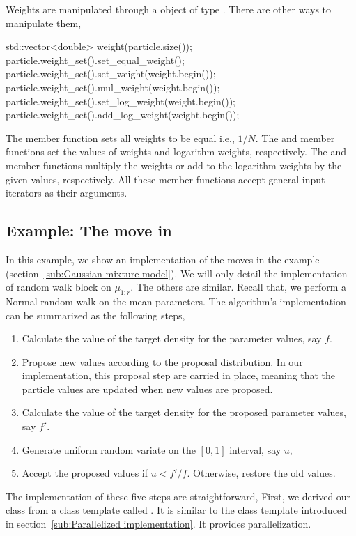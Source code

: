 Weights are manipulated through a object of type . There
are other ways to manipulate them,
\begin{cppcode}
std::vector<double> weight(particle.size());
particle.weight_set().set_equal_weight();
particle.weight_set().set_weight(weight.begin());
particle.weight_set().mul_weight(weight.begin());
particle.weight_set().set_log_weight(weight.begin());
particle.weight_set().add_log_weight(weight.begin());
\end{cppcode}
The  member function sets all weights to be equal
i.e., $1/N$. The  and  member
functions set the values of weights and logarithm weights, respectively. The
 and  member functions
multiply the weights or add to the logarithm weights by the given values,
respectively. All these member functions accept general input iterators as
their arguments.

\subsection{Example: The \protect\mcmc move in \protect\gmm}
\label{sub:Example: The mcmc move in gmm}

In this example, we show an implementation of the \mcmc moves in the \gmm
example (section~\ref{sub:Gaussian mixture model}). We will only detail the
implementation of random walk block on $\mu_{1:r}$. The others are similar.
Recall that, we perform a Normal random walk on the mean parameters. The \mcmc
algorithm's implementation can be summarized as the following steps,
\begin{enumerate}
  \item Calculate the value of the target density for the parameter values,
    say $f$.
  \item Propose new values according to the proposal distribution. In our
    implementation, this proposal step are carried in place, meaning that the
    particle values are updated when new values are proposed.
  \item Calculate the value of the target density for the proposed parameter
    values, say $f'$.
  \item Generate uniform random variate on the $[0,1]$ interval, say $u$,
  \item Accept the proposed values if $u < f'/f$. Otherwise, restore the old
    values.
\end{enumerate}
The implementation of these five steps are straightforward,
First, we derived our class from a class template called .
It is similar to the  class template introduced in
section~\ref{sub:Parallelized implementation}. It provides \openmp
parallelization.


